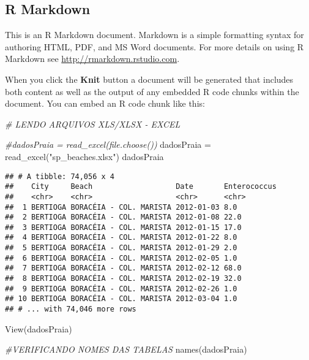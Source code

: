 \documentclass[
]{article}
\newenvironment{Shaded}{\begin{snugshade}}{\end{snugshade}}
\newcommand{\CommentTok}[1]{\textcolor[rgb]{0.56,0.35,0.01}{\textit{#1}}}
\newcommand{\FunctionTok}[1]{\textcolor[rgb]{0.00,0.00,0.00}{#1}}
\newcommand{\NormalTok}[1]{#1}
\newcommand{\OtherTok}[1]{\textcolor[rgb]{0.56,0.35,0.01}{#1}}
\newcommand{\StringTok}[1]{\textcolor[rgb]{0.31,0.60,0.02}{#1}}
\begin{document}
\hypertarget{r-markdown}{%
\subsection{R Markdown}\label{r-markdown}}

This is an R Markdown document. Markdown is a simple formatting syntax
for authoring HTML, PDF, and MS Word documents. For more details on
using R Markdown see \url{http://rmarkdown.rstudio.com}.

When you click the \textbf{Knit} button a document will be generated
that includes both content as well as the output of any embedded R code
chunks within the document. You can embed an R code chunk like this:

\begin{Shaded}
\begin{Highlighting}[]
\CommentTok{\# LENDO ARQUIVOS XLS/XLSX {-} EXCEL}

\CommentTok{\#dadosPraia = read\_excel(file.choose())}
\NormalTok{dadosPraia }\OtherTok{=} \FunctionTok{read\_excel}\NormalTok{(}\StringTok{"sp\_beaches.xlsx"}\NormalTok{)}
\NormalTok{dadosPraia}
\end{Highlighting}
\end{Shaded}

\begin{verbatim}
## # A tibble: 74,056 x 4
##    City     Beach                   Date       Enterococcus
##    <chr>    <chr>                   <chr>      <chr>       
##  1 BERTIOGA BORACÉIA - COL. MARISTA 2012-01-03 8.0         
##  2 BERTIOGA BORACÉIA - COL. MARISTA 2012-01-08 22.0        
##  3 BERTIOGA BORACÉIA - COL. MARISTA 2012-01-15 17.0        
##  4 BERTIOGA BORACÉIA - COL. MARISTA 2012-01-22 8.0         
##  5 BERTIOGA BORACÉIA - COL. MARISTA 2012-01-29 2.0         
##  6 BERTIOGA BORACÉIA - COL. MARISTA 2012-02-05 1.0         
##  7 BERTIOGA BORACÉIA - COL. MARISTA 2012-02-12 68.0        
##  8 BERTIOGA BORACÉIA - COL. MARISTA 2012-02-19 32.0        
##  9 BERTIOGA BORACÉIA - COL. MARISTA 2012-02-26 1.0         
## 10 BERTIOGA BORACÉIA - COL. MARISTA 2012-03-04 1.0         
## # ... with 74,046 more rows
\end{verbatim}

\begin{Shaded}
\begin{Highlighting}[]
\FunctionTok{View}\NormalTok{(dadosPraia)}




\CommentTok{\#VERIFICANDO NOMES DAS TABELAS}
\FunctionTok{names}\NormalTok{(dadosPraia)}
\end{Highlighting}
\end{Shaded}
\end{document}
